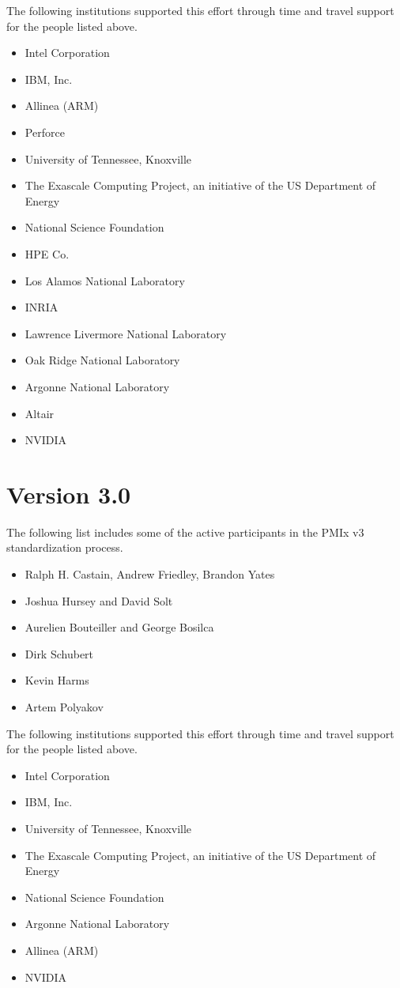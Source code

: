 The following institutions supported this effort through time and travel support for the people listed above.

\begin{itemize}
\item Intel Corporation
\item IBM, Inc.
\item Allinea (ARM)
\item Perforce
\item University of Tennessee, Knoxville
\item The Exascale Computing Project, an initiative of the US Department of Energy
\item National Science Foundation
\item HPE Co.
\item Los Alamos National Laboratory
\item INRIA
\item Lawrence Livermore National Laboratory
\item Oak Ridge National Laboratory
\item Argonne National Laboratory
\item Altair
\item NVIDIA
\end{itemize}

\section{Version 3.0}

The following list includes some of the active participants in the PMIx v3 standardization process.

\begin{itemize}
\item Ralph H. Castain, Andrew Friedley, Brandon Yates
\item Joshua Hursey and David Solt
\item Aurelien Bouteiller and George Bosilca
\item Dirk Schubert
\item Kevin Harms
\item Artem Polyakov
\end{itemize}

The following institutions supported this effort through time and travel support for the people listed above.

\begin{itemize}
\item Intel Corporation
\item IBM, Inc.
\item University of Tennessee, Knoxville
\item The Exascale Computing Project, an initiative of the US Department of Energy
\item National Science Foundation
\item Argonne National Laboratory
\item Allinea (ARM)
\item NVIDIA
\end{itemize}

